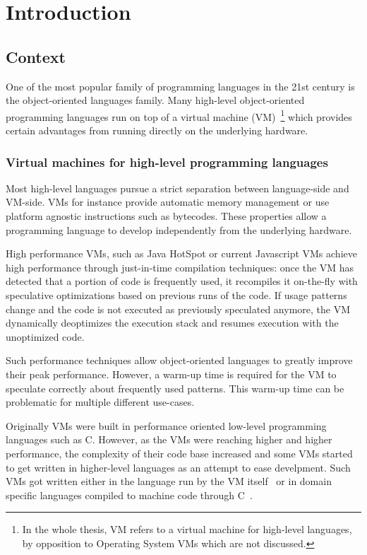 \documentclass[a4paper,12pt,twoside]{../includes/ThesisStyle}
\begin{document}
\fi

\chapter{Introduction}
\label{chap:intro}
\minitoc

\section{Context}

One of the most popular family of programming languages in the 21st century is the object-oriented languages family. Many high-level object-oriented programming languages run on top of a virtual machine (VM)~\footnote{In the whole thesis, VM refers to a virtual machine for high-level languages, by opposition to Operating System VMs which are not discussed.} which provides certain advantages from running directly on the underlying hardware. 

\subsection{Virtual machines for high-level programming languages}

Most high-level languages pursue a strict separation between language-side and VM-side. VMs for instance provide automatic memory management or use platform agnostic instructions such as bytecodes. These properties allow a programming language to develop independently from the underlying hardware.

High performance VMs, such as Java HotSpot or current Javascript VMs achieve high performance through just-in-time compilation techniques: once the VM has detected that a portion of code is frequently used, it recompiles it on-the-fly with speculative optimizations based on previous runs of the code. If usage patterns change and the code is not executed as previously speculated anymore, the VM dynamically deoptimizes the execution stack and resumes execution with the unoptimized code.

Such performance techniques allow object-oriented languages to greatly improve their peak performance. However, a warm-up time is required for the VM to speculate correctly about frequently used patterns. This warm-up time can be problematic for multiple different use-cases.

Originally VMs were built in performance oriented low-level programming languages such as C. However, as the VMs were reaching higher and higher performance, the complexity of their code base increased and some VMs started to get written in higher-level languages as an attempt to ease develpment. Such VMs got written either in the language run by the VM itself~\cite{Unga05b,Wimm13a,Alp99a} or in domain specific languages compiled to machine code through C~\cite{Rigo06a,Inga97a}.
\end{document}
